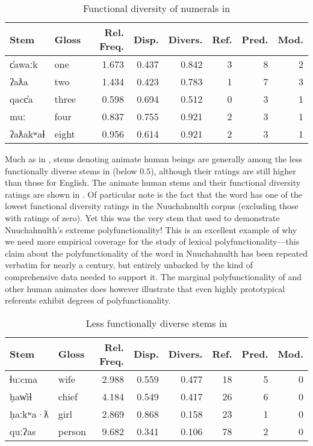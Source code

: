 \begin{table}[h!]
  \centering
  \caption{Functional diversity of numerals in }
  \label{tab:Nuuchahnulth-numerals}
  \begin{tabular}{ l l r r r r r r }
    \toprule
    Stem & Gloss & Rel. Freq. & Disp. & Divers. & Ref. & Pred. & Mod.\\
    \midrule
    c̓awaːk   & one   & 1.673 & 0.437 & 0.842 & 3 & 8 & 2\\
    ʔaƛa     & two   & 1.434 & 0.423 & 0.783 & 1 & 7 & 3\\
    qacc̓a    & three & 0.598 & 0.694 & 0.512 & 0 & 3 & 1\\
    muː      & four  & 0.837 & 0.755 & 0.921 & 2 & 3 & 1\\
    ʔaƛakʷaɬ & eight & 0.956 & 0.614 & 0.921 & 2 & 3 & 1\\
    \bottomrule
  \end{tabular}
\end{table}

Much as in , stems denoting animate human beings are generally among the less functionally diverse stems in  (below $0.5$), although their ratings are still higher than those for English. The animate human stems and their functional diversity ratings are shown in . Of particular note is the fact that the word   has one of the lowest functional diversity ratings in the Nuuchahnulth corpus (excluding those with ratings of zero). Yet this was the very stem that \textcite{Swadesh1939b} used to demonstrate Nuuchahnulth's extreme polyfunctionality! This is an excellent example of why we need more empirical coverage for the study of lexical polyfunctionality—this claim about the polyfunctionality of the word  in Nuuchahnulth has been repeated verbatim for nearly a century, but entirely unbacked by the kind of comprehensive data needed to support it. The marginal polyfunctionality of  and other human animates does however illustrate that even highly prototypical referents exhibit degrees of polyfunctionality.

\begin{table}
  \centering
  \caption{Less functionally diverse stems in }
  \label{tab:Nuuchahnulth-low-functional-diversity}
  \begin{tabular}{ l l r r r r r r }
    \toprule
    Stem     & Gloss  & Rel. Freq. & Disp. & Divers. & Ref. & Pred. & Mod.\\
    \midrule
    ɬuːcma   & wife   & 2.988      & 0.559 & 0.477 & 18   & 5     & 0  \\
    ḥaw̓iɬ    & chief  & 4.184      & 0.549 & 0.417 & 26   & 6     & 0  \\
    ḥaːkʷa·ƛ & girl   & 2.869      & 0.868 & 0.158 & 23   & 1     & 0  \\
    quːʔas   & person & 9.682      & 0.341 & 0.106 & 78   & 2     & 0  \\
    \bottomrule
  \end{tabular}
\end{table}

